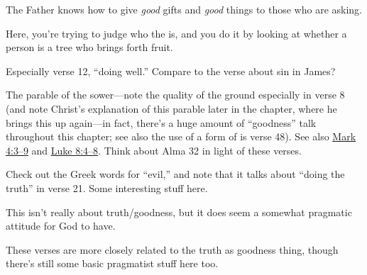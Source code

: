 		\begin{compactdesc}
		
			\item[{\hyperref[MATTHEW-7-11]{Matthew 7:11}}] The Father knows how to give \textit{good} gifts and \textit{good} things to those who are asking.
			\item[{\hyperref[MATTHEW-7-15]{Matthew 7:15--20}}] Here, you're trying to judge who the  is, and you do it by looking at whether a person is a  tree who brings forth  fruit.
			\item[{\hyperref[MATTHEW-12-10]{Matthew 12:10--12}}] Especially verse 12, ``doing well.'' Compare to the verse about sin in James?
			\item[{\hyperref[MATTHEW-12-33]{Matthew 12:33--35}}] 
			\item[{\hyperref[MATTHEW-13-1]{Matthew 13:1--9}}] The parable of the sower---note the quality of the ground especially in verse 8 (and note Christ's explanation of this parable later in the chapter, where he brings this up again---in fact, there's a huge amount of ``goodness'' talk throughout this chapter; see also the use of a form of  is verse 48). See also \hyperref[MARK-4-3]{Mark 4:3--9} and \hyperref[LUKE-8-4]{Luke 8:4--8}. Think about Alma 32 in light of these verses.
			\item[{\hyperref[LUKE-3-8]{Luke 3:8--9}}]
			\item[{\hyperref[LUKE-6-6]{Luke 6:6--11}}]
			\item[{\hyperref[LUKE-6-43]{Luke 6:43--45}}]
			\item[{\hyperref[LUKE-7-31]{Luke 7:31--35}}]
			\item[{\hyperref[JOHN-3-17]{John 3:17--21}}] Check out the Greek words for ``evil,'' and note that it talks about ``doing the truth'' in verse 21. Some interesting stuff here.
			\item[{\hyperref[ROMANS-2-4]{Romans 2:4}}] \phantom{.}
				\begin{compactitem}
					\item This isn't really about truth/goodness, but it does seem a somewhat pragmatic attitude for God to have.
				\end{compactitem}
			\item[{\hyperref[ROMANS-2-25]{Romans 2:25--29}}] \phantom{.}
				\begin{compactitem}
					\item These verses are more closely related to the truth as goodness thing, though there's still some basic pragmatist stuff here too.
				\end{compactitem} 
			\item[{\hyperref[ROMANS-3-7]{Romans 3:7--8}}]
			

\end{compactdesc}
